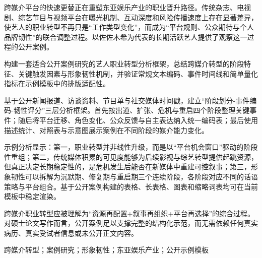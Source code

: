 跨媒介平台的快速更替正在重塑东亚娱乐产业的职业晋升路径。传统杂志、电视剧、综艺节目与视频平台在曝光机制、互动深度和风险传播速度上存在显著差异，使艺人的职业转型不再只是“工作类型变化”，而成为“平台规则、公众期待与个人品牌韧性”的联合调整过程。以佐佐木希为代表的长期活跃艺人提供了观察这一过程的公开案例。

构建一套适合公开案例研究的艺人职业转型分析框架，总结跨媒介转型的阶段特征、关键触发因素与形象韧性机制，并验证常规文本编码、事件时间线和简单量化指标在示例模板中的排版适配性。

基于公开新闻报道、访谈资料、节目单与社交媒体时间戳，建立“阶段划分-事件编码-韧性评分”三层分析框架。首先按出道、扩张、危机与重启四个阶段整理关键事件；随后将平台迁移、角色变化、公众反馈与自主表达纳入统一编码表；最后使用描述统计、对照表与示意图展示案例在不同阶段的媒介能力变化。

示例分析显示：第一，职业转型并非线性升级，而是以“平台机会窗口”驱动的阶段性重组；第二，传统媒体积累的可见度能够为后续影视与综艺转型提供起跳资源，但真正决定长期稳定性的，是危机发生后能否在新媒体中重建可控叙事；第三，形象韧性可以拆解为沉默期、修复期与重启期三个连续阶段，各阶段对应不同的话语策略与平台组合。基于公开案例构建的表格、长表格、图表和缩略词表均可在当前模板中稳定渲染。

跨媒介职业转型应被理解为“资源再配置+叙事再组织+平台再选择”的综合过程。对硕士论文写作而言，公开案例足以支撑完整的结构化示范，而无需依赖任何真实病历、真实受试者信息或未公开正文内容。

跨媒介转型；案例研究；形象韧性；东亚娱乐产业；公开示例模板
